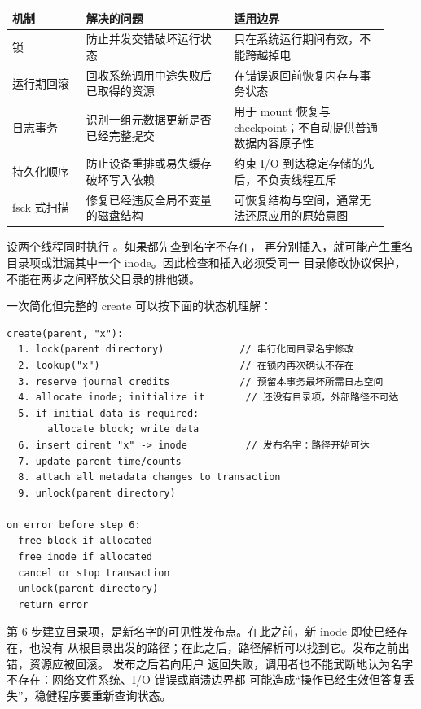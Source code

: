 \begin{longtable}{@{}F{0.18\linewidth}F{0.36\linewidth}F{0.38\linewidth}@{}}
\toprule
{}
机制 & 解决的问题 & 适用边界 \\
\midrule
锁 & 防止并发交错破坏运行状态 & 只在系统运行期间有效，不能跨越掉电 \\\tablerowrule
运行期回滚 & 回收系统调用中途失败后已取得的资源 & 在错误返回前恢复内存与事务状态 \\\tablerowrule
日志事务 & 识别一组元数据更新是否已经完整提交 & 用于 mount 恢复与 checkpoint；不自动提供普通数据内容原子性 \\\tablerowrule
持久化顺序 & 防止设备重排或易失缓存破坏写入依赖 & 约束 I/O 到达稳定存储的先后，不负责线程互斥 \\\tablerowrule
fsck 式扫描 & 修复已经违反全局不变量的磁盘结构 & 可恢复结构与空间，通常无法还原应用的原始意图 \\
\bottomrule
\end{longtable}


设两个线程同时执行 。如果都先查到名字不存在，
再分别插入，就可能产生重名目录项或泄漏其中一个 inode。因此检查和插入必须受同一
目录修改协议保护，不能在两步之间释放父目录的排他锁。

一次简化但完整的 create 可以按下面的状态机理解：

\begin{lstlisting}
create(parent, "x"):
  1. lock(parent directory)             // 串行化同目录名字修改
  2. lookup("x")                        // 在锁内再次确认不存在
  3. reserve journal credits            // 预留本事务最坏所需日志空间
  4. allocate inode; initialize it       // 还没有目录项，外部路径不可达
  5. if initial data is required:
       allocate block; write data
  6. insert dirent "x" -> inode          // 发布名字：路径开始可达
  7. update parent time/counts
  8. attach all metadata changes to transaction
  9. unlock(parent directory)

on error before step 6:
  free block if allocated
  free inode if allocated
  cancel or stop transaction
  unlock(parent directory)
  return error
\end{lstlisting}

第 6 步建立目录项，是新名字的可见性发布点。在此之前，新 inode 即使已经存在，也没有
从根目录出发的路径；在此之后，路径解析可以找到它。发布之前出错，资源应被回滚。
发布之后若向用户
返回失败，调用者也不能武断地认为名字不存在：网络文件系统、I/O 错误或崩溃边界都
可能造成“操作已经生效但答复丢失”，稳健程序要重新查询状态。

